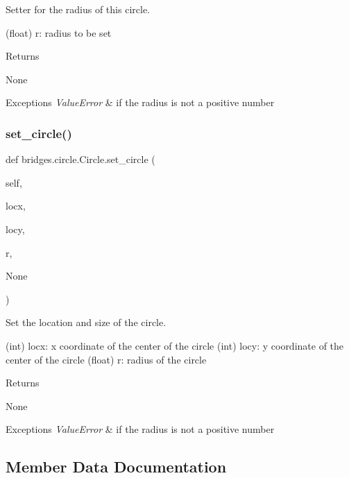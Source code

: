 Setter for the radius of this circle. 

(float) r\+: radius to be set \begin{DoxyReturn}{Returns}


None
\end{DoxyReturn}

\begin{DoxyExceptions}{Exceptions}
{\em Value\+Error} & if the radius is not a positive number \\
\hline
\end{DoxyExceptions}
\mbox{\label{classbridges_1_1circle_1_1_circle_a42b7ccd17017ca328371ce27e1bdbffe}} 
\subsubsection{\texorpdfstring{set\+\_\+circle()}{set\_circle()}}
{\footnotesize\ttfamily def bridges.\+circle.\+Circle.\+set\+\_\+circle (\begin{DoxyParamCaption}\item[{}]{self,  }\item[{}]{locx,  }\item[{}]{locy,  }\item[{}]{r,  }\item[{}]{None }\end{DoxyParamCaption})}



Set the location and size of the circle. 

(int) locx\+: x coordinate of the center of the circle (int) locy\+: y coordinate of the center of the circle (float) r\+: radius of the circle \begin{DoxyReturn}{Returns}


None
\end{DoxyReturn}

\begin{DoxyExceptions}{Exceptions}
{\em Value\+Error} & if the radius is not a positive number \\
\hline
\end{DoxyExceptions}


\subsection{Member Data Documentation}
\mbox{\label{classbridges_1_1circle_1_1_circle_a23b8dd93569e14abc63c41aa78e4c1a6}} 
